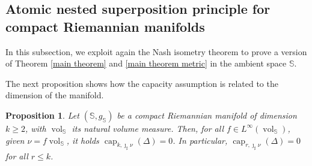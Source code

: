 \documentclass[10pt,leqno]{amsart}
\numberwithin{equation}{section}
\newtheorem{prop}[teorema]{Proposition}
\newcommand{\R}{\mathbb{R}}
\newcommand{\PP}{\mathcal{P}}
\newcommand{\Ss}{\mathbb{S}}
\begin{document}
\subsection{Atomic nested superposition principle for compact Riemannian manifolds}\label{subsec: atomic manifolds}
In this subsection, we exploit again the Nash isometry theorem to prove a version of Theorem \ref{main theorem} and \ref{main theorem metric} in the ambient space $\Ss$.






The next proposition shows how the capacity assumption is related to the dimension of the manifold.
\begin{prop}\label{prop: manifold capacity}
    Let $(\Ss,g_{\Ss})$ be a compact Riemannian manifold of dimension $k\geq 2$, with $\operatorname{vol}_{\Ss}$ its natural volume measure. Then, for all $f\in L^{\infty}(\operatorname{vol}_{\Ss})$, given $\nu = f\operatorname{vol}_{\Ss}$, it holds
    $\operatorname{cap}_{k,\jmath_\sharp \nu}(\Delta) = 0$. In particular, $\operatorname{cap}_{r,\jmath_\sharp \nu}(\Delta) = 0$ for all $r\leq k$.
\end{prop}
\end{document}
